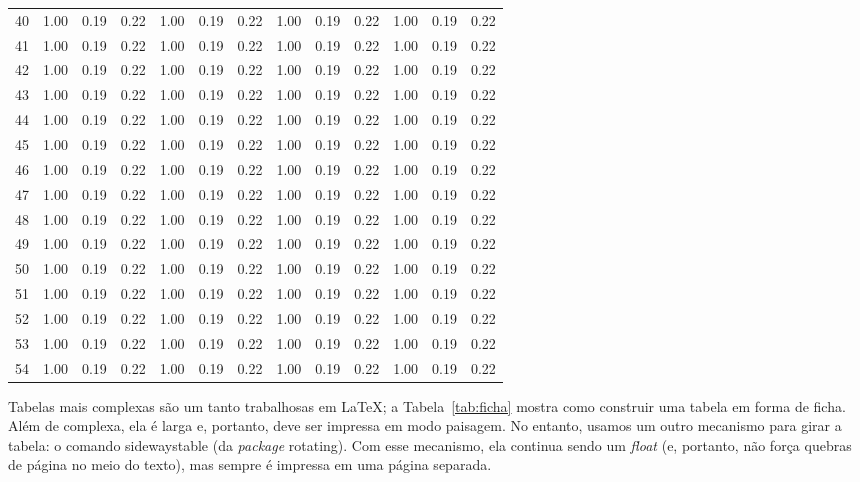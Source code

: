 \begin{center}
\begin{longtable}{|c|c|c|c|c|c|c|c|c|c|c|c|c|}
40 & 1.00 & 0.19 & 0.22 & 1.00 & 0.19 & 0.22 & 1.00 & 0.19 & 0.22 & 1.00 & 0.19 & 0.22 \\
41 & 1.00 & 0.19 & 0.22 & 1.00 & 0.19 & 0.22 & 1.00 & 0.19 & 0.22 & 1.00 & 0.19 & 0.22 \\
42 & 1.00 & 0.19 & 0.22 & 1.00 & 0.19 & 0.22 & 1.00 & 0.19 & 0.22 & 1.00 & 0.19 & 0.22 \\
43 & 1.00 & 0.19 & 0.22 & 1.00 & 0.19 & 0.22 & 1.00 & 0.19 & 0.22 & 1.00 & 0.19 & 0.22 \\
44 & 1.00 & 0.19 & 0.22 & 1.00 & 0.19 & 0.22 & 1.00 & 0.19 & 0.22 & 1.00 & 0.19 & 0.22 \\
45 & 1.00 & 0.19 & 0.22 & 1.00 & 0.19 & 0.22 & 1.00 & 0.19 & 0.22 & 1.00 & 0.19 & 0.22 \\
46 & 1.00 & 0.19 & 0.22 & 1.00 & 0.19 & 0.22 & 1.00 & 0.19 & 0.22 & 1.00 & 0.19 & 0.22 \\
47 & 1.00 & 0.19 & 0.22 & 1.00 & 0.19 & 0.22 & 1.00 & 0.19 & 0.22 & 1.00 & 0.19 & 0.22 \\
48 & 1.00 & 0.19 & 0.22 & 1.00 & 0.19 & 0.22 & 1.00 & 0.19 & 0.22 & 1.00 & 0.19 & 0.22 \\
49 & 1.00 & 0.19 & 0.22 & 1.00 & 0.19 & 0.22 & 1.00 & 0.19 & 0.22 & 1.00 & 0.19 & 0.22 \\
50 & 1.00 & 0.19 & 0.22 & 1.00 & 0.19 & 0.22 & 1.00 & 0.19 & 0.22 & 1.00 & 0.19 & 0.22 \\
51 & 1.00 & 0.19 & 0.22 & 1.00 & 0.19 & 0.22 & 1.00 & 0.19 & 0.22 & 1.00 & 0.19 & 0.22 \\
52 & 1.00 & 0.19 & 0.22 & 1.00 & 0.19 & 0.22 & 1.00 & 0.19 & 0.22 & 1.00 & 0.19 & 0.22 \\
53 & 1.00 & 0.19 & 0.22 & 1.00 & 0.19 & 0.22 & 1.00 & 0.19 & 0.22 & 1.00 & 0.19 & 0.22 \\
54 & 1.00 & 0.19 & 0.22 & 1.00 & 0.19 & 0.22 & 1.00 & 0.19 & 0.22 & 1.00 & 0.19 & 0.22 \\

\end{longtable}
\end{center}

Tabelas mais complexas são um tanto trabalhosas em \LaTeX{}; a
Tabela~\ref{tab:ficha} mostra como construir uma tabela em forma de ficha.
Além de complexa, ela é larga e, portanto, deve ser impressa em modo
paisagem. No entanto, usamos um outro mecanismo para girar a tabela: o
comando \textsf{sidewaystable} (da \textit{package} \textsf{rotating}).
Com esse mecanismo, ela continua sendo um \textit{float} (e, portanto,
não força quebras de página no meio do texto), mas sempre é impressa em
uma página separada.

